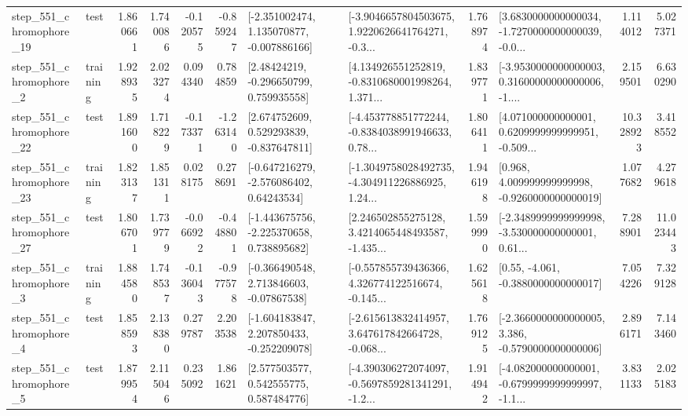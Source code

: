 \begin{tabular}{llrrrrllrlrr}
  step\_551\_chromophore\_19 &      test &      1.860661 &    1.740086 &     -0.120575 & -0.859247 &   [-2.351002474, 1.135070877, -0.007886166] &  [-3.9046657804503675, 1.9220626641764271, -0.3... &       1.768974 &  [3.6830000000000034, -1.7270000000000039, -0.0... &            1.114012 &          5.027371 \\
   step\_551\_chromophore\_2 &  training &      1.928935 &    2.023274 &      0.094340 &  0.784859 &     [2.48424219, -0.296650799, 0.759935558] &  [4.134926551252819, -0.8310680001998264, 1.371... &       1.839771 &  [-3.9530000000000003, 0.31600000000000006, -1.... &            2.159501 &          6.630290 \\
  step\_551\_chromophore\_22 &      test &      1.891600 &    1.718229 &     -0.173371 & -1.263140 &    [2.674752609, 0.529293839, -0.837647811] &  [-4.453778851772244, -0.8384038991946633, 0.78... &       1.806411 &  [4.071000000000001, 0.6209999999999951, -0.509... &           10.328923 &          3.418552 \\
  step\_551\_chromophore\_23 &  training &      1.823137 &    1.851311 &      0.028175 &  0.278691 &    [-0.647216279, -2.576086402, 0.64243534] &  [-1.3049758028492735, -4.304911226886925, 1.24... &       1.946198 &    [0.968, 4.009999999999998, -0.9260000000000019] &            1.077682 &          4.279618 \\
  step\_551\_chromophore\_27 &      test &      1.806701 &    1.739779 &     -0.066922 & -0.448801 &   [-1.443675756, -2.225370658, 0.738895682] &  [2.246502855275128, 3.4214065448493587, -1.435... &       1.599990 &  [-2.3489999999999998, -3.530000000000001, 0.61... &            7.288901 &         11.023443 \\
   step\_551\_chromophore\_3 &  training &      1.884580 &    1.748537 &     -0.136043 & -0.977578 &    [-0.366490548, 2.713846603, -0.07867538] &  [-0.557855739436366, 4.326774122516674, -0.145... &       1.625618 &                [0.55, -4.061, -0.3880000000000017] &            7.054226 &          7.329128 \\
   step\_551\_chromophore\_4 &      test &      1.858593 &    2.138380 &      0.279787 &  2.203538 &   [-1.604183847, 2.207850433, -0.252209078] &  [-2.615613832414957, 3.647617842664728, -0.068... &       1.769125 &  [-2.3660000000000005, 3.386, -0.5790000000000006] &            2.896171 &          7.143460 \\
   step\_551\_chromophore\_5 &      test &      1.879954 &    2.115046 &      0.235092 &  1.861621 &     [2.577503577, 0.542555775, 0.587484776] &  [-4.390306272074097, -0.5697859281341291, -1.2... &       1.914942 &  [-4.082000000000001, -0.6799999999999997, -1.1... &            3.831133 &          2.025183 \\

\end{tabular}
